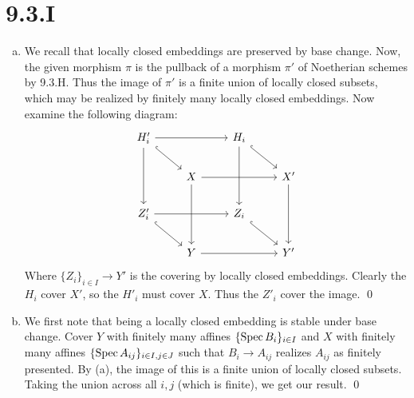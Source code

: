 \documentclass{article}
\begin{document}
\section{9.3.I}
\begin{enumerate}[a.]
    \item We recall that locally closed embeddings are preserved by base change. Now, the
          given morphism $\pi$ is the pullback of a morphism
          $\pi'$ of Noetherian schemes by 9.3.H. Thus the image of
          $\pi'$ is a finite union of locally closed subsets, which may
          be realized by finitely many locally closed embeddings. Now examine the
          following diagram: \[\begin{tikzcd}
                  {H_i'}                         &   & {H_i}
                  \\
                  & X &       & {X'}
                  \\{Z'_i} &   & {Z_i}        \\
                  & Y &       & {Y'}
                  \arrow[from=2-2, to=4-2]
                  \arrow[from=2-2, to=2-4]
                  \arrow[from=2-4, to=4-4]
                  \arrow[from=4-2, to=4-4]
                  \arrow[hook, from=3-3, to=4-4]
                  \arrow[hook, from=1-3, to=2-4]
                  \arrow[from=1-3, to=3-3]
                  \arrow[hook, from=1-1, to=2-2]
                  \arrow[hook, from=3-1, to=4-2]
                  \arrow[from=3-1, to=3-3]
                  \arrow[from=1-1, to=3-1]
                  \arrow[from=1-1, to=1-3]
              \end{tikzcd}\] Where $\{Z_i\}_{i\in I} \to Y'$ is the
          covering by locally closed embeddings. Clearly the $H_i$ cover
          $X'$, so the $H'_i$ must cover
          $X$. Thus the $Z'_i$ cover the image. \qed
    \item We first note that being a locally closed embedding is stable under base
          change. Cover $Y$ with finitely many affines
          $\{\operatorname{Spec} B_i\}_{i \in I}$ and $X$ with finitely many affines
          $\{\operatorname{Spec} A_{ij}\}_{i \in I,j \in J}$ such that $B_i \to A_{ij}$ realizes
          $A_{ij}$ as finitely presented. By (a), the image of this is a
          finite union of locally closed subsets. Taking the union across all
          $i, j$ (which is finite), we get our result. \qed
\end{enumerate}
\end{document}
